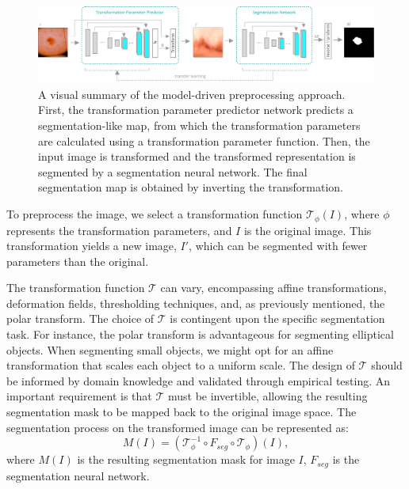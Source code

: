  	\begin{figure}[t!]
		\centering
		\includegraphics[width=\linewidth]{images/4/model-based-preprocessing-overview}
		\caption{A visual summary of the model-driven preprocessing approach. First, the transformation parameter predictor network predicts a segmentation-like map, from which the transformation parameters are calculated using a transformation parameter function. Then, the input image is transformed and the transformed representation is segmented by a segmentation neural network. The final segmentation map is obtained by inverting the transformation.}
		\label{fig:visual-summary-mdp}
	\end{figure}

To preprocess the image, we select a transformation function \(\mathcal{T}_{\phi}(I)\), where \(\phi\) represents the transformation parameters, and \(I\) is the original image. This transformation yields a new image, \(I'\), which can be segmented with fewer parameters than the original. 

The transformation function \(\mathcal{T}\) can vary, encompassing affine transformations, deformation fields, thresholding techniques, and, as previously mentioned, the polar transform. The choice of \(\mathcal{T}\) is contingent upon the specific segmentation task. For instance, the polar transform is advantageous for segmenting elliptical objects. When segmenting small objects, we might opt for an affine transformation that scales each object to a uniform scale. The design of \(\mathcal{T}\) should be informed by domain knowledge and validated through empirical testing. An important requirement is that \(\mathcal{T}\) must be invertible, allowing the resulting segmentation mask to be mapped back to the original image space. The segmentation process on the transformed image can be represented as:
\begin{equation}
	M(I) = (\mathcal{T}_{\phi}^{-1} \circ F_{seg} \circ \mathcal{T}_{\phi})(I),
\end{equation}
where $M(I)$ is the resulting segmentation mask for image $I$, $F_{seg}$ is the segmentation neural network. 

